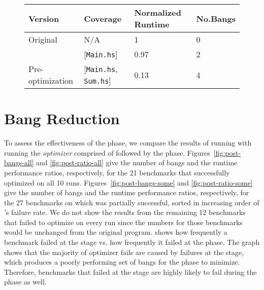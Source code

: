 \begin{figure}
\centering
\begin{tabular}{p{3cm}p{3.5cm}p{4cm}p{1.5cm}}
\hline
Version   & Coverage & Normalized Runtime & No.Bangs \\
\hline
Original      & N/A   &   1  & 0   \\
\Ao{}       & [\texttt{Main.hs}]      & 0.97    &  2\\
Pre-optimization    & [\texttt{Main.hs}, \texttt{Sum.hs}]         & 0.13      & 4\\
\hline
\end{tabular}
\label{fig:sumList}
\end{figure}


\section{\Postopt{} Bang Reduction}

To assess the effectiveness of the \postopt{} phase,
we compare the results of running \Ao{} with running
the \textit{\Postopt{} optimizer} comprised of \Ao{} followed by
the \postopt{} phase.
Figures~\ref{fig:post-bangs-all} and \ref{fig:post-ratio-all}
give the number of bangs and the runtime performance ratios,
respectively, for the 21 benchmarks that \At{} successfully optimized on all 10 runs.
Figures~\ref{fig:post-bangs-some} and \ref{fig:post-ratio-some}
give the number of bangs and the runtime performance ratios, respectively,
for the 27 benchmarks on which \At{} was partially successful,
sorted in increasing order of \At{}'s failure rate.
We do not show the results from the remaining 12 benchmarks that \At{}
failed to optimize on every run since the numbers for those benchmarks
would be unchanged from the original program.   shows how
frequently a benchmark failed at the \Ao{} stage vs. how frequently it
failed at the \postopt{} phase. The graph shows that the majority of \Postopt{} optimizer fails are
caused by failures at the \Ao{} stage, which produces a poorly
performing set of bangs for the \postopt{} phase to
minimize. Therefore, benchmarks that failed at the \Ao{} stage are
highly likely to fail during  the \postopt{} phase as well.


